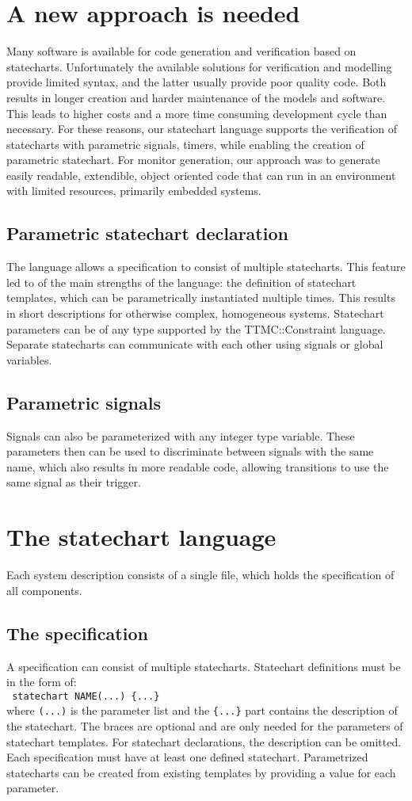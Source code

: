 \documentclass{book}
\begin{document}
\section{A new approach is needed}
Many software is available for code generation and verification based on statecharts. Unfortunately the available solutions for verification and modelling provide limited syntax, and the latter usually provide poor quality code. Both results in longer creation and harder maintenance of the models and software. This leads to higher costs and a more time consuming development cycle than necessary. For these reasons, our statechart language supports the verification of statecharts with parametric signals, timers, while enabling the creation of parametric statechart. For monitor generation, our approach was to generate easily readable, extendible, object oriented code that can run in an environment with limited resources, primarily embedded systems.
  \subsection{Parametric statechart declaration}
The language allows a specification to consist of multiple statecharts. This feature led to of the main strengths of the language: the definition of statechart templates, which can be parametrically instantiated multiple times. This results in short descriptions for otherwise complex, homogeneous systems. Statechart parameters can be of any type supported by the TTMC::Constraint language. Separate statecharts can communicate with each other using signals or global variables.
  \subsection{Parametric signals}
Signals can also be parameterized with any integer type variable. These parameters then can be used to discriminate between signals with the same name, which also results in more readable code, allowing transitions to use the same signal as their trigger.
\section{The statechart language}
Each system description consists of a single file, which holds the specification of all components.
  \subsection{The specification}
A specification can consist of multiple statecharts. Statechart definitions must be in the form of: \\\verb! statechart NAME(...) {...}!\\ where \verb!(...)! is the parameter list and the \verb!{...}! part contains the description of the statechart. The braces are optional and are only needed for the parameters of statechart templates. For statechart declarations, the description can be omitted. Each specification must have at least one defined statechart. Parametrized statecharts can be created from existing templates by providing a value for each parameter.
\end{document}
